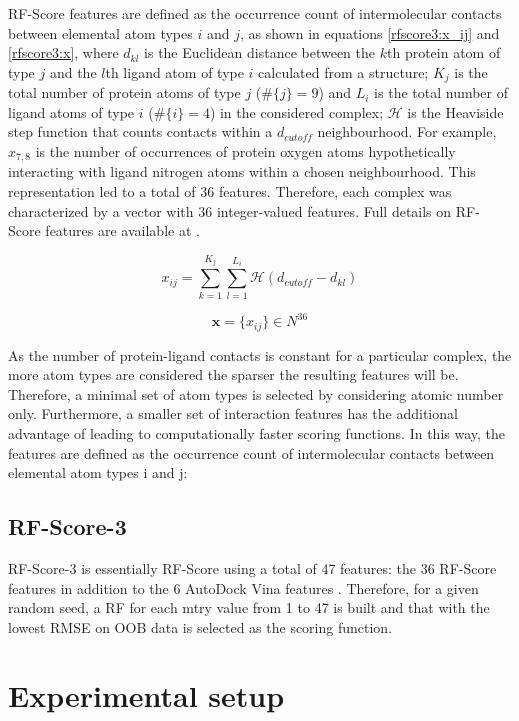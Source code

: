 \documentclass{llncs}
\begin{document}
RF-Score features are defined as the occurrence count of intermolecular contacts between elemental atom types $i$ and $j$, as shown in equations \ref{rfscore3:x_ij} and \ref{rfscore3:x}, where $d_{kl}$ is the Euclidean distance between the $k$th protein atom of type $j$ and the $l$th ligand atom of type $i$ calculated from a structure; $K_j$ is the total number of protein atoms of type $j$ ($\#\{j\}=9$) and $L_i$ is the total number of ligand atoms of type $i$ ($\#\{i\}=4$) in the considered complex; $\mathcal{H}$ is the Heaviside step function that counts contacts within a $d_{cutoff}$ neighbourhood. For example, $x_{7,8}$ is the number of occurrences of protein oxygen atoms hypothetically interacting with ligand nitrogen atoms within a chosen neighbourhood. This representation led to a total of 36 features. Therefore, each complex was characterized by a vector with 36 integer-valued features. Full details on RF-Score features are available at \cite{564,1295}.

\begin{equation}
\label{rfscore3:x_ij}
x_{ij}=\sum_{k=1}^{K_j}\sum_{l=1}^{L_i}\mathcal{H}(d_{cutoff}-d_{kl})
\end{equation}

\begin{equation}
\label{rfscore3:x}
\mathbf x=\{x_{ij}\}\in N^{36}
\end{equation}

As the number of protein-ligand contacts is constant for a particular complex, the more atom types are considered the sparser the resulting features will be. Therefore, a minimal set of atom types is selected by considering atomic number only. Furthermore, a smaller set of interaction features has the additional advantage of leading to computationally faster scoring functions. In this way, the features are defined as the occurrence count of intermolecular contacts between elemental atom types i and j:

\subsection{RF-Score-3}

RF-Score-3 is essentially RF-Score using a total of 47 features: the 36 RF-Score features \cite{564} in addition to the 6 AutoDock Vina features \cite{595}. Therefore, for a given random seed, a RF for each mtry value from 1 to 47 is built and that with the lowest RMSE on OOB data is selected as the scoring function.

\section{Experimental setup}
\end{document}

